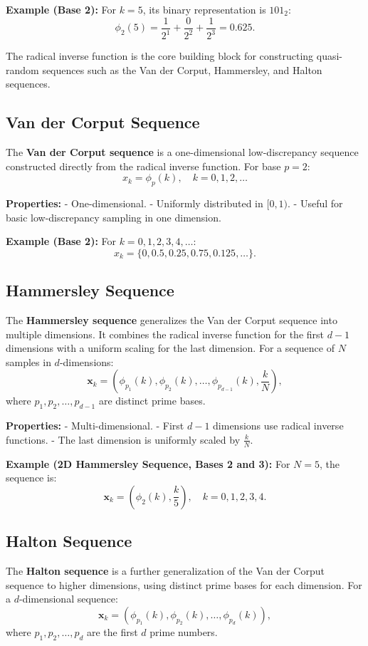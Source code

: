 \documentclass{article}
\begin{document}
\textbf{Example (Base 2):}
For \( k = 5 \), its binary representation is \( 101_2 \):
\[
    \phi_2(5) = \frac{1}{2^1} + \frac{0}{2^2} + \frac{1}{2^3} = 0.625.
\]

The radical inverse function is the core building block for constructing quasi-random sequences such as the Van der Corput, Hammersley, and Halton sequences.

\subsection{Van der Corput Sequence}
The \textbf{Van der Corput sequence} is a one-dimensional low-discrepancy sequence constructed directly from the radical inverse function. For base \( p = 2 \):
\[
    x_k = \phi_p(k), \quad k = 0, 1, 2, \dots
\]

\textbf{Properties:}
- One-dimensional.
- Uniformly distributed in \([0, 1)\).
- Useful for basic low-discrepancy sampling in one dimension.

\textbf{Example (Base 2):}
For \( k = 0, 1, 2, 3, 4, \dots \):
\[
    x_k = \{0, 0.5, 0.25, 0.75, 0.125, \dots\}.
\]

\subsection{Hammersley Sequence}
The \textbf{Hammersley sequence} generalizes the Van der Corput sequence into multiple dimensions. It combines the radical inverse function for the first \( d-1 \) dimensions with a uniform scaling for the last dimension. For a sequence of \( N \) samples in \( d \)-dimensions:
\[
    \mathbf{x}_k = \left( \phi_{p_1}(k), \phi_{p_2}(k), \dots, \phi_{p_{d-1}}(k), \frac{k}{N} \right),
\]
where \( p_1, p_2, \dots, p_{d-1} \) are distinct prime bases.

\textbf{Properties:}
- Multi-dimensional.
- First \( d-1 \) dimensions use radical inverse functions.
- The last dimension is uniformly scaled by \( \frac{k}{N} \).

\textbf{Example (2D Hammersley Sequence, Bases 2 and 3):}
For \( N = 5 \), the sequence is:
\[
    \mathbf{x}_k = \left( \phi_2(k), \frac{k}{5} \right), \quad k = 0, 1, 2, 3, 4.
\]

\subsection{Halton Sequence}
The \textbf{Halton sequence} is a further generalization of the Van der Corput sequence to higher dimensions, using distinct prime bases for each dimension. For a \( d \)-dimensional sequence:
\[
    \mathbf{x}_k = \left( \phi_{p_1}(k), \phi_{p_2}(k), \dots, \phi_{p_d}(k) \right),
\]
where \( p_1, p_2, \dots, p_d \) are the first \( d \) prime numbers.
\end{document}
